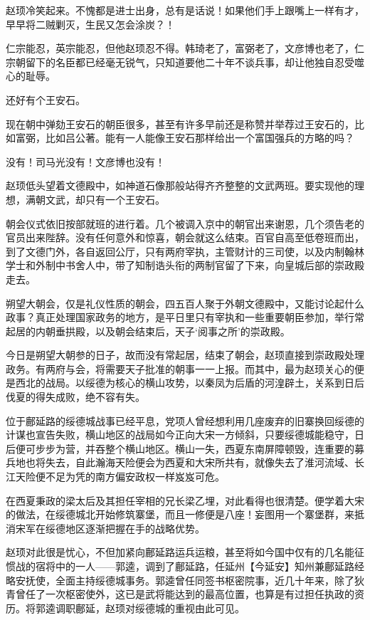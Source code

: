 赵顼冷笑起来。不愧都是进士出身，总有是话说！如果他们手上跟嘴上一样有才，早早将二贼剿灭，生民又怎会涂炭？！

仁宗能忍，英宗能忍，但他赵顼忍不得。韩琦老了，富弼老了，文彦博也老了，仁宗朝留下的名臣都已经毫无锐气，只知道要他二十年不谈兵事，却让他独自忍受噬心的耻辱。

还好有个王安石。

现在朝中弹劾王安石的朝臣很多，甚至有许多早前还是称赞并举荐过王安石的，比如富弼，比如吕公著。能有一人能像王安石那样给出一个富国强兵的方略的吗？

没有！司马光没有！文彦博也没有！

赵顼低头望着文德殿中，如神道石像那般站得齐齐整整的文武两班。要实现他的理想，满朝文武，却只有一个王安石。

朝会仪式依旧按部就班的进行着。几个被调入京中的朝官出来谢恩，几个须告老的官员出来陛辞。没有任何意外和惊喜，朝会就这么结束。百官自高至低卷班而出，到了文德门外，各自返回公厅，只有两府宰执，主管财计的三司使，以及内制翰林学士和外制中书舍人中，带了知制诰头衔的两制官留了下来，向皇城后部的崇政殿走去。

朔望大朝会，仅是礼仪性质的朝会，四五百人聚于外朝文德殿中，又能讨论起什么政事？真正处理国家政务的地方，是平日里只有宰执和一些重要朝臣参加，举行常起居的内朝垂拱殿，以及朝会结束后，天子‘阅事之所’的崇政殿。

今日是朔望大朝参的日子，故而没有常起居，结束了朝会，赵顼直接到崇政殿处理政务。有两府与会，将需要天子批准的朝事一一上报。而其中，最为赵顼关心的便是西北的战局。以绥德为核心的横山攻势，以秦凤为后盾的河湟辟土，关系到日后伐夏的得失成败，绝不容有失。

位于鄜延路的绥德城战事已经平息，党项人曾经想利用几座废弃的旧寨换回绥德的计谋也宣告失败，横山地区的战局如今正向大宋一方倾斜，只要绥德城能稳守，日后便可步步为营，并吞整个横山地区。横山一失，西夏东南屏障顿毁，连重要的募兵地也将失去，自此瀚海天险便会为西夏和大宋所共有，就像失去了淮河流域、长江天险便不足为凭的南方偏安政权一样岌岌可危。

在西夏秉政的梁太后及其担任宰相的兄长梁乙埋，对此看得也很清楚。便学着大宋的做法，在绥德城北开始修筑寨堡，而且一修便是八座！妄图用一个寨堡群，来抵消宋军在绥德地区逐渐把握在手的战略优势。

赵顼对此很是忧心，不但加紧向鄜延路运兵运粮，甚至将如今国中仅有的几名能征惯战的宿将中的一人——郭逵，调到了鄜延路，任延州【今延安】知州兼鄜延路经略安抚使，全面主持绥德城事务。郭逵曾任同签书枢密院事，近几十年来，除了狄青曾任了一次枢密使外，这已是武将能达到的最高位置，也算是有过担任执政的资历。将郭逵调职鄜延，赵顼对绥德城的重视由此可见。

